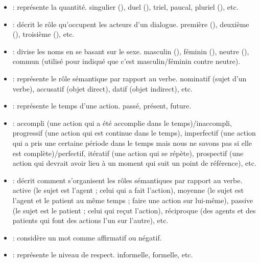 \documentclass{KodeBook}
\begin{document}
\begin{itemize}
	\item {} : représente la quantité. 
	singulier (), duel (), triel, paucal, pluriel (), etc. 
	
	\item {} : décrit le rôle qu'occupent les acteurs d'un dialogue. 
	première (), deuxième (), troisième (), etc.
	
	\item {} : divise les noms en se basant sur le sexe. 
	masculin (), féminin (), neutre (), commun (utilisé pour indiqué que c'est masculin/féminin contre neutre).
	
	\item {} : représente le rôle sémantique par rapport au verbe. 
	nominatif (sujet d'un verbe), accusatif (objet direct), datif (objet indirect), etc.
	
	\item {} : représente le temps d'une action. passé, présent, future.
	
	\item {} : accompli (une action qui a été accomplie dans le temps)/inaccompli, progressif (une action qui est continue dans le temps), imperfectif (une action qui a pris une certaine période dans le temps mais nous ne savons pas si elle est complète)/perfectif, itératif (une action qui se répète), prospectif (une action qui devrait avoir lieu à un moment qui suit un point de référence), etc.
	
	\item {} : décrit comment s'organisent les rôles sémantiques par rapport au verbe.
	active (le sujet est l'agent ; celui qui a fait l'action), moyenne (le sujet est l'agent et le patient au même temps ; faire une action sur lui-même), passive (le sujet est le patient ; celui qui reçut l'action), réciproque (des agents et des patients qui font des actions l'un sur l'autre), etc.
	
	\item {} : considère un mot comme affirmatif ou négatif.
	\item {} : représente le niveau de respect. informelle, formelle, etc.
\end{itemize}
\end{document}
